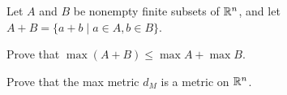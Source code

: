 {\begin{comment}
Now we address the triangle inequality. Let $z = (z_1, z_2, \ldots, z_n) \in \R^n$. Then
\begin{align*}
d_T(x,z) &=  \sum_{i=1}^n | x_i-z_i | \\
	&= \sum_{i=1}^n | (x_i-y_i) + (y_i-z_i) | \\
	&\leq \sum_{i=1}^n | (x_i-y_i) | + |(y_i-z_i) | \\
	&= \sum_{i=1}^n | (x_i-y_i) | + \sum_{i=1}^n |(y_i-z_i) | \\
	&= d_T(x,y) + d_T(y,z).
\end{align*}

\end{comment}

\item \label{ex:Max} Let $A$ and $B$ be nonempty finite subsets of $\mathbb{R}^n$, and let $A+B = \{a+b \mid a \in A, b \in B\}$.

\ba

\item Prove that $\max (A+B) \leq \max A + \max B$.

\item Prove that the max metric $d_M$ is a metric on $\mathbb{R}^n$. 

\ea

\begin{comment}

\ExerciseSolution 

\ba

\item Let $m = \max (A+B)$. Then $m = a+b$ for some $a \in A$ and $b \in B$. Now $a \leq \max A$ and $b \leq \max B$, so $m = a+b \leq \max A + \max B$. 

\item Let $x = (x_1, x_2, \ldots, x_n)$ and $y = (y_1, y_2, \ldots, y_n)$ be in $\R^n$. Since $d_E(x_i,y_i) = |x_i-y_i|  \geq 0$ for each $i$, it follows that
\[d_M(x,y) = \max\{ | x_i-y_i | \} \geq 0.\]
We also know that $|r-s| = |s-r|$ for any $r, s \in \R$, so 
\[d_M(x,y) = \max\{ | x_i-y_i | \} = \max\{ | y_i-x_i | \} = d_M(y,x).\]

Suppose $x = y$. Then $x_i=y_i$ for each $i$ and 
\[d_M(x,y) = \max\{ | x_i-y_i | \} = 0.\]

Conversely, if $d_M(x,y) = 0$, the fact that $|x_i - y_i| \geq 0$ for each $i$ implies that we must have $|x_i-y_i| = 0$ for each $i$. Consequently, $x_i = y_i$ for each $i$ and $x = y$.

Now we address the triangle inequality. Let $z = (z_1, z_2, \ldots, z_n) \in \R^n$. From part (a) we then have
\begin{align*}
d_M(x,z) &= \max\{ | x_i-z_i | \} \\
	&= \max\{ | (x_i-y_i) + (y_i-z_i) | \} \\
	&\leq \max\{ |x_i-y_i| + |y_i-z_i| \} \\
	&\leq \max \{(x_i-y_i) |\} + \max\{|(y_i-z_i) | \} \\
	&= d_M(x,y) + d_M(y,z).
\end{align*}


\end{comment}}
